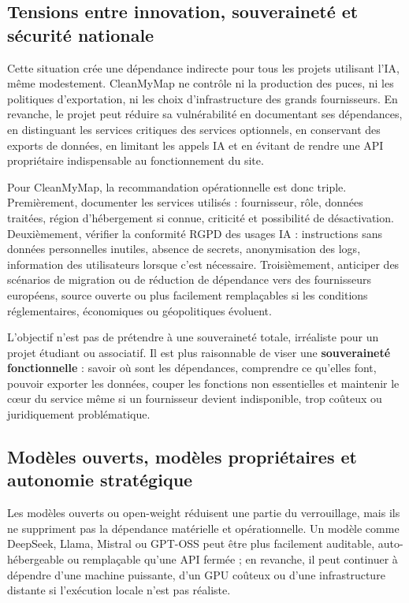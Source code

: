 \documentclass[
  10pt,
  a4paper,
  DIV=11,
  numbers=noendperiod,
  oneside]{scrreprt}
\let\oldtextbf\textbf
\renewcommand{\textbf}[1]{\oldtextbf{\textcolor{cmmnavy}{#1}}}
\begin{document}
\subsection{Tensions entre innovation, souveraineté et sécurité
nationale}\label{tensions-entre-innovation-souverainetuxe9-et-suxe9curituxe9-nationale}

Cette situation crée une dépendance indirecte pour tous les projets
utilisant l'IA, même modestement. CleanMyMap ne contrôle ni la
production des puces, ni les politiques d'exportation, ni les choix
d'infrastructure des grands fournisseurs. En revanche, le projet peut
réduire sa vulnérabilité en documentant ses dépendances, en distinguant
les services critiques des services optionnels, en conservant des
exports de données, en limitant les appels IA et en évitant de rendre
une API propriétaire indispensable au fonctionnement du site.

Pour CleanMyMap, la recommandation opérationnelle est donc triple.
Premièrement, documenter les services utilisés : fournisseur, rôle,
données traitées, région d'hébergement si connue, criticité et
possibilité de désactivation. Deuxièmement, vérifier la conformité RGPD
des usages IA : instructions sans données personnelles inutiles, absence
de secrets, anonymisation des logs, information des utilisateurs lorsque
c'est nécessaire. Troisièmement, anticiper des scénarios de migration ou
de réduction de dépendance vers des fournisseurs européens, source
ouverte ou plus facilement remplaçables si les conditions
réglementaires, économiques ou géopolitiques évoluent.

L'objectif n'est pas de prétendre à une souveraineté totale, irréaliste
pour un projet étudiant ou associatif. Il est plus raisonnable de viser
une \textbf{souveraineté fonctionnelle} : savoir où sont les
dépendances, comprendre ce qu'elles font, pouvoir exporter les données,
couper les fonctions non essentielles et maintenir le cœur du service
même si un fournisseur devient indisponible, trop coûteux ou
juridiquement problématique.

\subsection{Modèles ouverts, modèles propriétaires et autonomie
stratégique}\label{moduxe8les-ouverts-moduxe8les-propriuxe9taires-et-autonomie-stratuxe9gique}

Les modèles ouverts ou open-weight réduisent une partie du verrouillage,
mais ils ne suppriment pas la dépendance matérielle et opérationnelle.
Un modèle comme DeepSeek, Llama, Mistral ou GPT-OSS peut être plus
facilement auditable, auto-hébergeable ou remplaçable qu'une API fermée
; en revanche, il peut continuer à dépendre d'une machine puissante,
d'un GPU coûteux ou d'une infrastructure distante si l'exécution locale
n'est pas réaliste.
\end{document}
